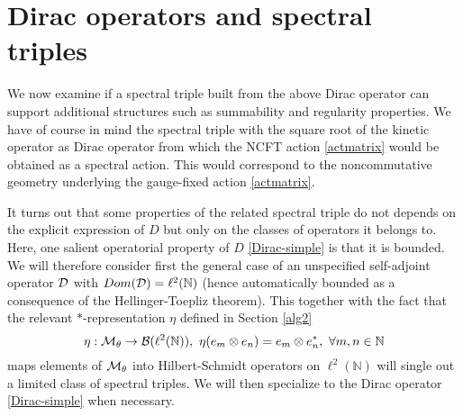 \documentclass[a4paper,11pt,twoside]{article}
\numberwithin{equation}{section}
\theoremstyle{nonumberplain}
\newcounter{and}
\begin{document}
\section{Dirac operators and spectral triples}\label{ncg}
We now examine if a spectral triple built from the above Dirac operator can support additional structures such as summability and regularity properties. We have of course in mind the spectral triple with the square root of the kinetic operator as Dirac operator from which the NCFT action \eqref{actmatrix} would be obtained as a spectral action. This would correspond to the noncommutative geometry underlying the gauge-fixed action \eqref{actmatrix}.\par 

It turns out that some properties of the related spectral triple do not depends on the explicit expression of $D$ but only on the classes of operators it belongs to. Here, one salient operatorial property of $D$ \eqref{Dirac-simple} is that it is bounded. We will therefore consider first the general case of an unspecified self-adjoint operator ${\cal{D}}$ with $Dom({\cal{D}})=\ell^2(\mathbb{N})$ (hence automatically bounded as a consequence of the Hellinger-Toepliz theorem). This together with the fact that the relevant $*$-representation $\eta$ defined in Section \ref{alg2} 
\begin{equation}
\eta:{\cal{M}}_\theta\to{\cal{B}}(\ell^2(\mathbb{N})),\ \eta(e_m\otimes e_n)=e_m\otimes e^*_n,\ \forall m,n\in\mathbb{N}\label{Left-representation}
\end{equation}
maps elements of ${\cal{M}}_\theta$ into Hilbert-Schmidt operators on $\ell^2(\mathbb{N})$ will single out a limited class of spectral triples. We will then specialize to the Dirac operator \eqref{Dirac-simple} when necessary.\par
\end{document}
